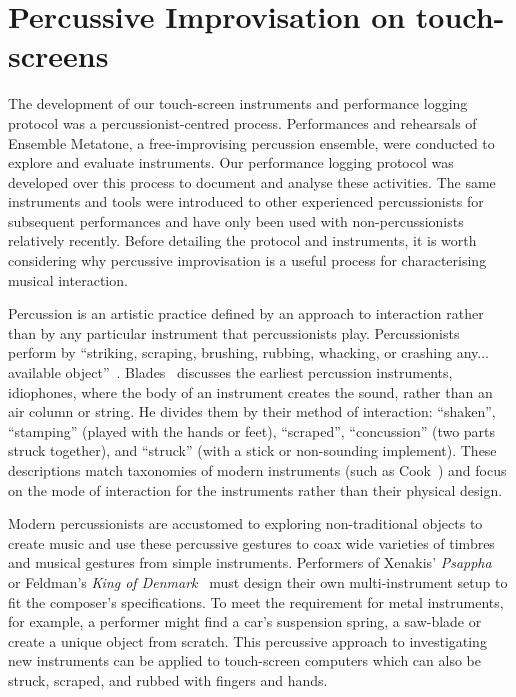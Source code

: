 \documentclass[graybox]{svmult}
\begin{document}


\section{Percussive Improvisation on touch-screens}
\label{sec:percussive-interaction}

The development of our touch-screen instruments and performance
logging protocol was a percussionist-centred process. Performances and
rehearsals of Ensemble Metatone, a free-improvising percussion
ensemble, were conducted to explore and evaluate instruments. Our
performance logging protocol was developed over this process to
document and analyse these activities. The same instruments and tools
were introduced to other experienced percussionists for subsequent
performances and have only been used with non-percussionists
relatively recently. Before detailing the protocol and instruments, it
is worth considering why percussive improvisation is a useful process
for characterising musical interaction.

Percussion is an artistic practice defined by an approach to
interaction rather than by any particular instrument that
percussionists play. Percussionists perform by ``striking, scraping,
brushing, rubbing, whacking, or crashing any... available
object''~\cite{Schick:2006fk}. Blades~\cite{Blades:1992kx} discusses
the earliest percussion instruments, idiophones, where the body of an
instrument creates the sound, rather than an air column or string. He
divides them by their method of interaction: ``shaken'', ``stamping''
(played with the hands or feet), ``scraped'', ``concussion'' (two
parts struck together), and ``struck'' (with a stick or non-sounding
implement). These descriptions match taxonomies of modern instruments
(such as Cook~\cite{Cook:1997vn}) and focus on the mode of interaction
for the instruments rather than their physical design.

Modern percussionists are accustomed to exploring non-traditional
objects to create music and use these percussive gestures to coax wide
varieties of timbres and musical gestures from simple instruments.
Performers of Xenakis' \emph{Psappha}~\cite{Xenakis:1975uq} or
Feldman's \emph{King of Denmark}~\cite{Feldman:1965uq} must design
their own multi-instrument setup to fit the composer's specifications.
To meet the requirement for metal instruments, for example, a
performer might find a car's suspension spring, a saw-blade or create
a unique object from scratch. This percussive approach to
investigating new instruments can be applied to touch-screen computers
which can also be struck, scraped, and rubbed with fingers and hands.
\end{document}

